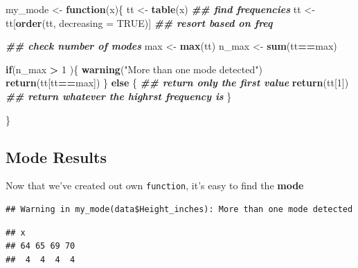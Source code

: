 \documentclass[
]{book}
\newenvironment{Shaded}{\begin{snugshade}}{\end{snugshade}}
\newcommand{\AttributeTok}[1]{\textcolor[rgb]{0.13,0.29,0.53}{#1}}
\newcommand{\ConstantTok}[1]{\textcolor[rgb]{0.56,0.35,0.01}{#1}}
\newcommand{\ControlFlowTok}[1]{\textcolor[rgb]{0.13,0.29,0.53}{\textbf{#1}}}
\newcommand{\DecValTok}[1]{\textcolor[rgb]{0.00,0.00,0.81}{#1}}
\newcommand{\DocumentationTok}[1]{\textcolor[rgb]{0.56,0.35,0.01}{\textbf{\textit{#1}}}}
\newcommand{\FunctionTok}[1]{\textcolor[rgb]{0.13,0.29,0.53}{\textbf{#1}}}
\newcommand{\NormalTok}[1]{#1}
\newcommand{\OtherTok}[1]{\textcolor[rgb]{0.56,0.35,0.01}{#1}}
\newcommand{\SpecialCharTok}[1]{\textcolor[rgb]{0.81,0.36,0.00}{\textbf{#1}}}
\newcommand{\StringTok}[1]{\textcolor[rgb]{0.31,0.60,0.02}{#1}}
\begin{document}
\begin{Shaded}
\begin{Highlighting}[]
\NormalTok{my\_mode }\OtherTok{\textless{}{-}} \ControlFlowTok{function}\NormalTok{(x)\{}
\NormalTok{  tt }\OtherTok{\textless{}{-}} \FunctionTok{table}\NormalTok{(x) }\DocumentationTok{\#\# find frequencies}
\NormalTok{  tt }\OtherTok{\textless{}{-}}\NormalTok{ tt[}\FunctionTok{order}\NormalTok{(tt, }\AttributeTok{decreasing =} \ConstantTok{TRUE}\NormalTok{)] }\DocumentationTok{\#\# resort based on freq}
  
  \DocumentationTok{\#\# check number of modes}
\NormalTok{  max }\OtherTok{\textless{}{-}} \FunctionTok{max}\NormalTok{(tt)}
\NormalTok{  n\_max }\OtherTok{\textless{}{-}} \FunctionTok{sum}\NormalTok{(tt}\SpecialCharTok{==}\NormalTok{max)}
  
  
  \ControlFlowTok{if}\NormalTok{(n\_max }\SpecialCharTok{\textgreater{}} \DecValTok{1}\NormalTok{ )\{}
    \FunctionTok{warning}\NormalTok{(}\StringTok{"More than one mode detected"}\NormalTok{)}
    \FunctionTok{return}\NormalTok{(tt[tt}\SpecialCharTok{==}\NormalTok{max])}
\NormalTok{  \} }\ControlFlowTok{else}\NormalTok{ \{}
    \DocumentationTok{\#\# return only the first value}
    \FunctionTok{return}\NormalTok{(tt[}\DecValTok{1}\NormalTok{]) }\DocumentationTok{\#\# return whatever the highrst frequency is}
\NormalTok{  \}}

  
\NormalTok{\}}
\end{Highlighting}
\end{Shaded}

\hypertarget{mode-results}{%
\subsection{Mode Results}\label{mode-results}}

Now that we've created out own \texttt{function}, it's easy to find the \textbf{mode}

\begin{Shaded}
\end{Shaded}

\begin{verbatim}
## Warning in my_mode(data$Height_inches): More than one mode detected
\end{verbatim}

\begin{verbatim}
## x
## 64 65 69 70 
##  4  4  4  4
\end{verbatim}
\end{document}
